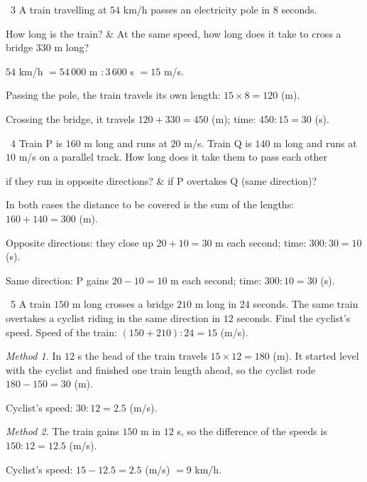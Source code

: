 \gap
\begin{exbox}{\ExWord\ 3}
A train travelling at $54$ km/h passes an electricity pole in $8$ seconds.
\begin{cols2}
 How long is the train? &  At the same speed, how long does it take to cross a bridge $330$ m long?
\end{cols2}
\guide
$54$ km/h $=54\,000$ m $:3\,600$ s $=15$ m/s.\par
{} Passing the pole, the train travels its own length: $15\times8=120$ (m).\par
{} Crossing the bridge, it travels $120+330=450$ (m); time: $450:15=30$ (s).
\end{exbox}
\gap
\begin{exbox}{\ExWord\ 4}
Train P is $160$ m long and runs at $20$ m/s. Train Q is $140$ m long and runs at $10$ m/s on a parallel track. How long does it take them to pass each other
\begin{cols2}
 if they run in opposite directions? &  if P overtakes Q (same direction)?
\end{cols2}
\guide
In both cases the distance to be covered is the sum of the lengths: $160+140=300$ (m).\par
{} Opposite directions: they close up $20+10=30$ m each second; time: $300:30=10$ (s).\par
{} Same direction: P gains $20-10=10$ m each second; time: $300:10=30$ (s).
\end{exbox}
\gap
\begin{exbox}{\ExWord\ 5}
A train $150$ m long crosses a bridge $210$ m long in $24$ seconds. The same train overtakes a cyclist riding in the same direction in $12$ seconds. Find the cyclist's speed.
\guide
Speed of the train: $(150+210):24=15$ (m/s).\par\smallskip
\textit{Method 1.} In $12$ s the head of the train travels $15\times12=180$ (m). It started level with the cyclist and finished one train length ahead, so the cyclist rode $180-150=30$ (m).\par
Cyclist's speed: $30:12=2.5$ (m/s).\par\smallskip
\textit{Method 2.} The train gains $150$ m in $12$ s, so the difference of the speeds is $150:12=12.5$ (m/s).\par
Cyclist's speed: $15-12.5=2.5$ (m/s) $=9$ km/h.
\end{exbox}
